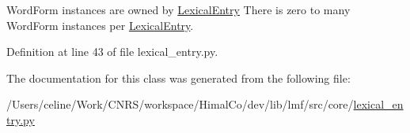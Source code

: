 Word\+Form instances are owned by \hyperlink{classlmf_1_1src_1_1core_1_1lexical__entry_1_1_lexical_entry}{Lexical\+Entry} There is zero to many Word\+Form instances per \hyperlink{classlmf_1_1src_1_1core_1_1lexical__entry_1_1_lexical_entry}{Lexical\+Entry}. 



Definition at line 43 of file lexical\+\_\+entry.\+py.



The documentation for this class was generated from the following file\+:\begin{DoxyCompactItemize}
\item 
/\+Users/celine/\+Work/\+C\+N\+R\+S/workspace/\+Himal\+Co/dev/lib/lmf/src/core/\hyperlink{lexical__entry_8py}{lexical\+\_\+entry.\+py}\end{DoxyCompactItemize}
